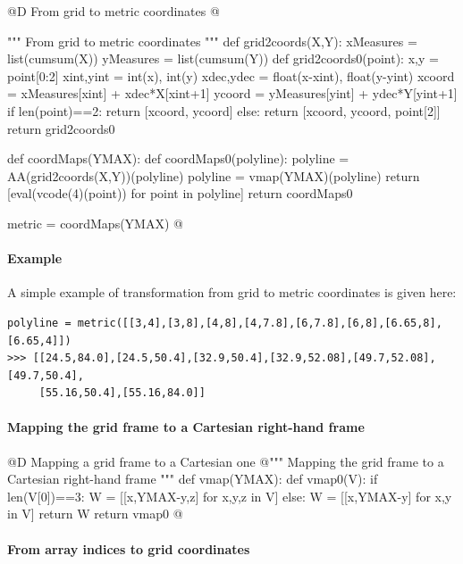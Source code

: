 \documentclass[11pt,oneside]{article}    %
\begin{document}
@D From grid to metric coordinates
@{""" From grid to metric coordinates """
def grid2coords(X,Y):
    xMeasures = list(cumsum(X))
    yMeasures = list(cumsum(Y))
    def grid2coords0(point):
        x,y = point[0:2]
        xint,yint = int(x), int(y)
        xdec,ydec = float(x-xint), float(y-yint)
        xcoord = xMeasures[xint] + xdec*X[xint+1]
        ycoord = yMeasures[yint] + ydec*Y[yint+1]
        if len(point)==2: return [xcoord, ycoord]
        else: return [xcoord, ycoord, point[2]]
    return grid2coords0

def coordMaps(YMAX):
    def coordMaps0(polyline):
        polyline = AA(grid2coords(X,Y))(polyline)
        polyline = vmap(YMAX)(polyline)
        return [eval(vcode(4)(point)) for point in polyline]
    return coordMaps0

metric = coordMaps(YMAX)
@}


\paragraph{Example} 
A simple example of transformation from grid to metric coordinates is given here:
{\small 
\begin{verbatim}
polyline = metric([[3,4],[3,8],[4,8],[4,7.8],[6,7.8],[6,8],[6.65,8],[6.65,4]])
>>> [[24.5,84.0],[24.5,50.4],[32.9,50.4],[32.9,52.08],[49.7,52.08],[49.7,50.4],
     [55.16,50.4],[55.16,84.0]]
\end{verbatim}}


\paragraph{Mapping the grid frame to a Cartesian right-hand frame}
@D Mapping a grid frame to a Cartesian one
@{""" Mapping the grid frame to a Cartesian right-hand frame """
def vmap(YMAX):
    def vmap0(V):
        if len(V[0])==3: W = [[x,YMAX-y,z] for x,y,z in V]
        else: W = [[x,YMAX-y] for x,y in V]
        return W
    return vmap0
@}


\paragraph{From array indices to grid coordinates}
\end{document}

